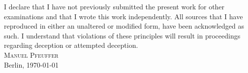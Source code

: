 I declare that I have not previously submitted the  present  work  for  other  examinations and that I wrote this work independently.
All sources that I have reproduced in either an unaltered or modified form, have been acknowledged as such.
I understand that violations of these principles will result in proceedings regarding deception or attempted deception.
\vspace{2cm}\\
\textsc{Manuel Pfeuffer}\\
Berlin, \today
